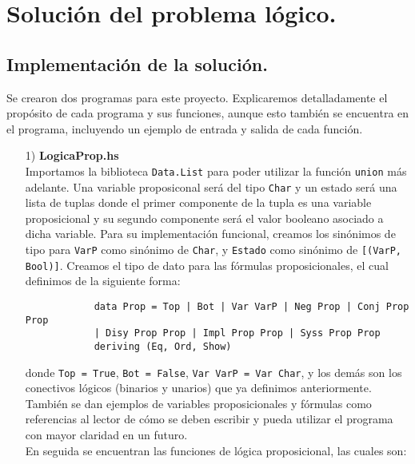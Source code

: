 \documentclass[letterpaper,11pt]{article}
\begin{document}
    \section{Solución del problema lógico.}
    \subsection{Implementación de la solución.}
    Se crearon dos programas para este proyecto. Explicaremos detalladamente el 
    propósito de cada programa y sus funciones, aunque esto también se 
    encuentra en el programa, incluyendo un ejemplo de entrada y salida de 
    cada función.
    \begin{itemize}
        \item[1)] \textbf{LogicaProp.hs} \\
        Importamos la biblioteca \texttt{Data.List} para poder utilizar 
        la función \texttt{union} más adelante. Una variable proposiconal 
        será del tipo \texttt{Char} y un estado será una lista de tuplas donde 
        el primer componente de la tupla es una variable proposicional y su 
        segundo componente será el valor booleano asociado a dicha variable.
        Para su implementación funcional, creamos los sinónimos de tipo para 
        \texttt{VarP} como sinónimo de \texttt{Char}, y \texttt{Estado} como 
        sinónimo de \texttt{[(VarP, Bool)]}. Creamos el tipo de dato para las 
        fórmulas proposicionales, el cual definimos de la siguiente forma:

        \begin{lstlisting}
            data Prop = Top | Bot | Var VarP | Neg Prop | Conj Prop Prop 
            | Disy Prop Prop | Impl Prop Prop | Syss Prop Prop 
            deriving (Eq, Ord, Show)
        \end{lstlisting}

        donde \texttt{Top = True}, \texttt{Bot = False}, 
        \texttt{Var VarP = Var Char}, y los demás son los conectivos lógicos
        (binarios y unarios) que ya definimos anteriormente. \\
        También se dan ejemplos de variables proposicionales y fórmulas 
        como referencias al lector de cómo se deben escribir y pueda utilizar 
        el programa con mayor claridad en un futuro. \\ 
        En seguida se encuentran las funciones de lógica proposicional, las
        cuales son:


\end{itemize}
\end{document}
